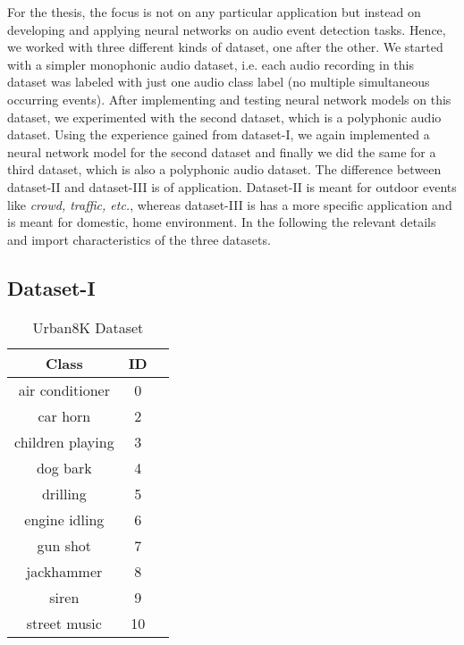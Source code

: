 For the thesis, the focus is not on any particular application but instead on developing and applying neural networks on audio event detection tasks. Hence, we worked with three different kinds of dataset, one after the other. We started with a simpler monophonic audio dataset, i.e. each audio recording in this dataset was labeled with just one audio class label (no multiple simultaneous occurring events). After implementing and testing neural network models on this dataset, we experimented with the second dataset, which is a polyphonic audio dataset. Using the experience gained from dataset-I, we again implemented a neural network model for the second dataset and finally we did the same for a third dataset, which is also a polyphonic audio dataset. The difference between dataset-II and dataset-III is of application. Dataset-II is meant for outdoor events like \textsl{crowd, traffic, etc.}, whereas dataset-III is has a more specific application and is meant for domestic, home environment. In the following the relevant details and import characteristics of the three datasets.

\subsection{Dataset-I}

\begin{table}[!hb]
\caption[Urban8K Dataset]{Urban8K Dataset}
\label{tab:db1_bkg}
\centering
\begin{tabular}{ccc}
\toprule
Class & ID \\ 
\midrule
air conditioner	& 0 \\
car horn	& 2 \\
children playing	& 3 \\
dog bark	& 4 \\
drilling	& 5 \\
engine idling	& 6 \\
gun shot	& 7 \\
jackhammer	& 8 \\
siren	& 9 \\
street music	& 10 \\
\bottomrule 
\end{tabular}
\end{table}

